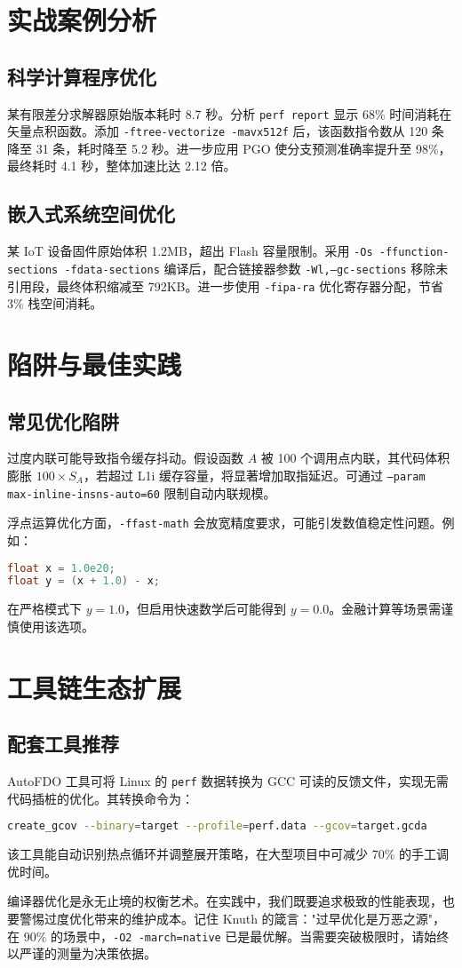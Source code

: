 \chapter{实战案例分析}
\section{科学计算程序优化}
某有限差分求解器原始版本耗时 8.7 秒。分析 \texttt{perf report} 显示 68\%{} 时间消耗在矢量点积函数。添加 \texttt{-ftree-vectorize -mavx512f} 后，该函数指令数从 120 条降至 31 条，耗时降至 5.2 秒。进一步应用 PGO 使分支预测准确率提升至 98\%{}，最终耗时 4.1 秒，整体加速比达 2.12 倍。\par
\section{嵌入式系统空间优化}
某 IoT 设备固件原始体积 1.2MB，超出 Flash 容量限制。采用 \texttt{-Os -ffunction-sections -fdata-sections} 编译后，配合链接器参数 \texttt{-Wl,--gc-sections} 移除未引用段，最终体积缩减至 792KB。进一步使用 \texttt{-fipa-ra} 优化寄存器分配，节省 3\%{} 栈空间消耗。\par
\chapter{陷阱与最佳实践}
\section{常见优化陷阱}
过度内联可能导致指令缓存抖动。假设函数 $A$ 被 100 个调用点内联，其代码体积膨胀 $100 \times S_A$，若超过 L1i 缓存容量，将显著增加取指延迟。可通过 \texttt{--param max-inline-insns-auto=60} 限制自动内联规模。\par
浮点运算优化方面，\texttt{-ffast-math} 会放宽精度要求，可能引发数值稳定性问题。例如：\par
\begin{lstlisting}[language=c]
float x = 1.0e20;
float y = (x + 1.0) - x;
\end{lstlisting}
在严格模式下 $y=1.0$，但启用快速数学后可能得到 $y=0.0$。金融计算等场景需谨慎使用该选项。\par
\chapter{工具链生态扩展}
\section{配套工具推荐}
AutoFDO 工具可将 Linux 的 \texttt{perf} 数据转换为 GCC 可读的反馈文件，实现无需代码插桩的优化。其转换命令为：\par
\begin{lstlisting}[language=bash]
create_gcov --binary=target --profile=perf.data --gcov=target.gcda
\end{lstlisting}
该工具能自动识别热点循环并调整展开策略，在大型项目中可减少 70\%{} 的手工调优时间。\par
编译器优化是永无止境的权衡艺术。在实践中，我们既要追求极致的性能表现，也要警惕过度优化带来的维护成本。记住 Knuth 的箴言："过早优化是万恶之源"，在 90\%{} 的场景中，\texttt{-O2 -march=native} 已是最优解。当需要突破极限时，请始终以严谨的测量为决策依据。\par
